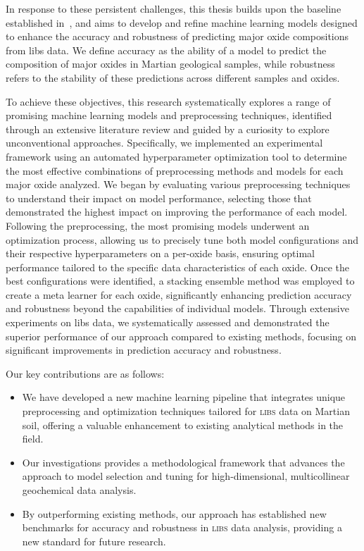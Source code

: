 In response to these persistent challenges, this thesis builds upon the baseline established in~\citet{p9_paper}, and aims to develop and refine machine learning models designed to enhance the accuracy and robustness of predicting major oxide compositions from \gls{libs} data.
We define accuracy as the ability of a model to predict the composition of major oxides in Martian geological samples, while robustness refers to the stability of these predictions across different samples and oxides.

To achieve these objectives, this research systematically explores a range of promising machine learning models and preprocessing techniques, identified through an extensive literature review and guided by a curiosity to explore unconventional approaches.
Specifically, we implemented an experimental framework using an automated hyperparameter optimization tool to determine the most effective combinations of preprocessing methods and models for each major oxide analyzed.
We began by evaluating various preprocessing techniques to understand their impact on model performance, selecting those that demonstrated the highest impact on improving the performance of each model.
Following the preprocessing, the most promising models underwent an optimization process, allowing us to precisely tune both model configurations and their respective hyperparameters on a per-oxide basis, ensuring optimal performance tailored to the specific data characteristics of each oxide.
Once the best configurations were identified, a stacking ensemble method was employed to create a meta learner for each oxide, significantly enhancing prediction accuracy and robustness beyond the capabilities of individual models.
Through extensive experiments on \gls{libs} data, we systematically assessed and demonstrated the superior performance of our approach compared to existing methods, focusing on significant improvements in prediction accuracy and robustness.

Our key contributions are as follows:
\begin{itemize}
    \item We have developed a new machine learning pipeline that integrates unique preprocessing and optimization techniques tailored for \textsc{libs} data on Martian soil, offering a valuable enhancement to existing analytical methods in the field.
    \item Our investigations provides a methodological framework that advances the approach to model selection and tuning for high-dimensional, multicollinear geochemical data analysis.
    \item By outperforming existing methods, our approach has established new benchmarks for accuracy and robustness in \textsc{libs} data analysis, providing a new standard for future research.
\end{itemize}


